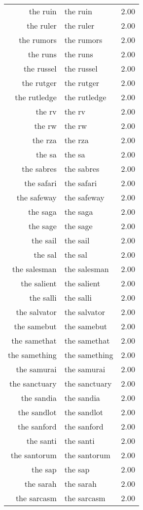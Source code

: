 \begin{table}[ht]
\begin{tabular}{rlr}
  the ruin & the ruin & 2.00 \\ 
  the ruler & the ruler & 2.00 \\ 
  the rumors & the rumors & 2.00 \\ 
  the runs & the runs & 2.00 \\ 
  the russel & the russel & 2.00 \\ 
  the rutger & the rutger & 2.00 \\ 
  the rutledge & the rutledge & 2.00 \\ 
  the rv & the rv & 2.00 \\ 
  the rw & the rw & 2.00 \\ 
  the rza & the rza & 2.00 \\ 
  the sa & the sa & 2.00 \\ 
  the sabres & the sabres & 2.00 \\ 
  the safari & the safari & 2.00 \\ 
  the safeway & the safeway & 2.00 \\ 
  the saga & the saga & 2.00 \\ 
  the sage & the sage & 2.00 \\ 
  the sail & the sail & 2.00 \\ 
  the sal & the sal & 2.00 \\ 
  the salesman & the salesman & 2.00 \\ 
  the salient & the salient & 2.00 \\ 
  the salli & the salli & 2.00 \\ 
  the salvator & the salvator & 2.00 \\ 
  the samebut & the samebut & 2.00 \\ 
  the samethat & the samethat & 2.00 \\ 
  the samething & the samething & 2.00 \\ 
  the samurai & the samurai & 2.00 \\ 
  the sanctuary & the sanctuary & 2.00 \\ 
  the sandia & the sandia & 2.00 \\ 
  the sandlot & the sandlot & 2.00 \\ 
  the sanford & the sanford & 2.00 \\ 
  the santi & the santi & 2.00 \\ 
  the santorum & the santorum & 2.00 \\ 
  the sap & the sap & 2.00 \\ 
  the sarah & the sarah & 2.00 \\ 
  the sarcasm & the sarcasm & 2.00 \\ 

\end{tabular}
\end{table}
